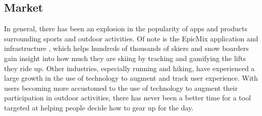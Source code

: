 \subsection{Market}
In general, there has been an explosion in the popularity of apps and products surrounding sports and outdoor activities.
Of note is the EpicMix application and infrastructure \cite{EpicMix:Site}, which helps hundreds of thousands of skiers and snow
boarders \cite{EpicMix:PlayStore} gain insight into how much they are skiing by tracking and gamifying the lifts they ride up.
Other industries, especially running and hiking, have experienced a large growth in the use of technology to augment and
track user experience. With users becoming more accustomed to the use of technology to augment their participation in outdoor
activities, there has never been a better time for a tool targeted at helping people decide how to gear up for the day.
